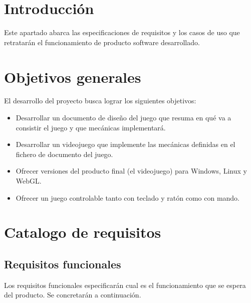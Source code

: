 
\section{Introducción}
Este apartado abarca las especificaciones de requisitos y los casos de uso que retratarán el funcionamiento de producto software desarrollado.

\section{Objetivos generales}
El desarrollo del proyecto busca lograr los siguientes objetivos:
\begin{itemize}
\item
Desarrollar un documento de diseño del juego que resuma en qué va a consistir el juego y que mecánicas implementará.
\item
Desarrollar un videojuego que implemente las mecánicas definidas en el fichero de documento del juego.
\item
Ofrecer versiones del producto final (el videojuego) para Windows, Linux y WebGL.
\item
Ofrecer un juego controlable tanto con teclado y ratón como con mando.
\end{itemize}

\section{Catalogo de requisitos}
\subsection{Requisitos funcionales}
Los requisitos funcionales especificarán cual es el funcionamiento que se espera del producto. Se concretarán a continuación.

